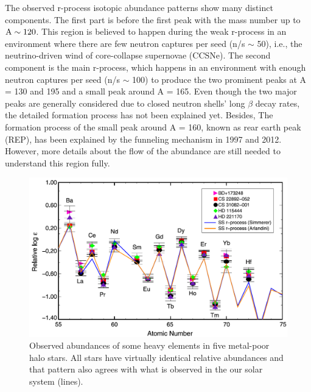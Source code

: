 \documentclass[aps,prl,preprint,groupedaddress]{revtex4}
\begin{document}
The observed r-process isotopic abundance patterns show many distinct components. The first part is before the first peak with the mass number up to $\rm{A \sim 120}$. This region is believed to happen during the weak r-process in an environment where there are few neutron captures per seed (n/s $\sim$ 50)\cite{1996}, i.e., the neutrino-driven wind of core-collapse supernovae (CCSNe)\cite{1994ApJ...433..229W}. The second component is the main r-process, which happens in an environment with enough neutron captures per seed (n/s $\sim$ 100) to produce the two prominent peaks at A = 130 and 195 and a small peak around A = 165. Even though the two major peaks are generally considered due to closed neutron shells' long $\beta$ decay rates, the detailed formation process has not been explained yet. Besides, The formation process of the small peak around A = 160, known as rear earth peak (REP), has been explained by the funneling mechanism in 1997\cite{1997astro.ph..1007S} and 2012\cite{PhysRevC.85.045801}. However, more details about the flow of the abundance are still needed to understand this region fully. 

\begin{figure}
\centering
\includegraphics[scale=0.23]{halo_samples}
\caption{
Observed abundances of some heavy elements in five metal-poor halo stars. All stars have virtually identical relative abundances and that pattern also agrees with what is observed in the
our solar system (lines).
}
\label{fig:halo_samples}
\end{figure}
\end{document}

